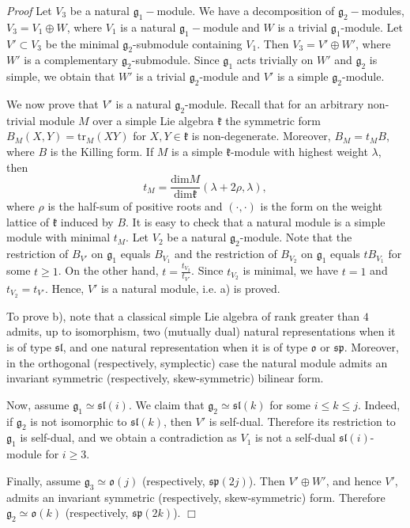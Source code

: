 \documentclass[10pt]{amsart}
\renewenvironment{proof}{ \emph{Proof}}{$\Box$}
\renewcommand{\sp}{\mathfrak{sp}}
\renewcommand{\sl}{\mathfrak{sl}}
\newcommand{\kk}{\mathfrak{k}}
\newcommand{\oo}{\mathfrak{o}}
\renewcommand{\gg}{\mathfrak{g}}
\begin{document}
\begin{proof} Let $V_3$ be a natural $\gg_1-$module. We have a
  decomposition of $\gg_2-$modules, $V_3=V_1\oplus W$, where 
$V_1$ is a natural 
$\gg_1-$module and $W$ is a trivial $\gg_1$-module. Let $V'\subset
  V_3$ be the minimal $\gg_2$-submodule containing $V_1$. Then 
$V_3=V'\oplus W'$, where $W'$ 
is a complementary $\gg_2$-submodule. Since $\gg_1$ acts trivially on $W'$ and $\gg_2$ is simple, we obtain that $W'$ is a trivial $\gg_2$-module and $V'$ is a 
simple $\gg_2$-module. 

We now prove that $V'$ is a natural $\gg_2$-module. Recall that for an arbitrary non-trivial
module $M$ over a simple Lie algebra $\kk$ the symmetric form $B_M(X,Y)=\mathrm{tr}_M(XY)$ for $X,Y\in \kk$ is non-degenerate. 
Moreover, $B_M=t_MB$, where $B$ is the Killing form. If $M$ is a
simple $\kk$-module with highest weight $\lambda$, then 
$$t_M=\frac{\mathrm{dim}M}{\mathrm{dim}\kk}(\lambda+2\rho,\lambda),$$
where $\rho$ is the half-sum of positive roots and $(\cdot,\cdot)$ is
the form on the weight lattice of $\kk$ induced by $B$. 
It is easy to check that a natural module is a simple module with minimal $t_M$.
Let $V_2$ be a natural $\gg_2$-module. Note that the restriction of $B_{V'}$ on $\gg_1$ equals $B_{V_1}$ and the restriction of
$B_{V_2}$ on $\gg_1$ equals $tB_{V_1}$ for some $t\geq 1$. On the
other hand, $t=\frac{t_{V_2}}{t_{V'}}$. Since 
$t_{V_2}$ is minimal, we have
$t=1$ and $t_{V_2}=t_{V'}$. Hence, $V'$ is a natural module, i.e. a) is proved.

To prove b), note that a classical simple Lie algebra of rank greater than $4$ admits, up to isomorphism, two (mutually dual) 
natural representations when it is of type $\sl$, and one natural representation when it is of type $\oo$ or $\sp$. Moreover, 
in the orthogonal (respectively, symplectic) case the natural module admits 
an invariant symmetric (respectively, skew-symmetric) bilinear form.

Now, assume $\gg_1\simeq \sl(i)$. We claim that $\gg_2\simeq \sl(k)$ for some $i\leq k\leq j$.
Indeed, if $\gg_2$ is not isomorphic to $\sl(k)$, then $V'$ is self-dual. Therefore its restriction 
to $\gg_1$ is self-dual, and we obtain a contradiction as $V_1$ is not a self-dual $\sl(i)$-module for $i\geq 3$.

Finally, assume $\gg_3\simeq \oo(j)$ (respectively, $\sp(2j)$). Then $V'\oplus W'$, and hence $V'$, admits an invariant symmetric 
(respectively, skew-symmetric) form. Therefore $\gg_2\simeq \oo(k)$ (respectively, $\sp(2k)$).
\end{proof}
\end{document}
